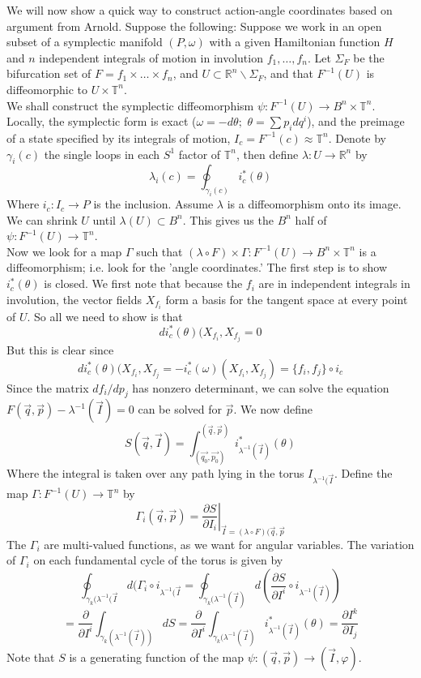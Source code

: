 \indent We will now show a quick way to construct action-angle coordinates based on argument from Arnold. Suppose the following: Suppose we work in an open subset of a symplectic manifold $(P,\omega)$ with a given Hamiltonian function $H$ and $n$ independent integrals of motion in involution $f_1, \ldots, f_n$. Let $\Sigma_F$ be the bifurcation set of $F= f_1 \times \ldots \times f_n$, and $U \subset \mathbb{R}^n \backslash \Sigma_F$, and that $F^{-1}(U)$ is diffeomorphic to $U \times \mathbb{T}^n$.\\
\indent We shall construct the symplectic diffeomorphism $\psi: F^{-1}(U) \to B^n \times \mathbb{T}^n$. Locally, the symplectic form is exact ($\omega = - d \theta; \hspace{4pt} \theta = \sum p_i dq^i$), and the preimage of a state specified by its integrals of motion, $I_c = F^{-1}(c) \approx \mathbb{T}^n$. Denote by $\gamma_i(c)$ the single loops in each $S^1$ factor of $\mathbb{T}^n$, then define $\lambda: U \to \mathbb{R}^n$ by 
\[ \lambda_i(c) = \oint_{\gamma_i(c)} i_c^*(\theta)  \]
\indent Where $i_c: I_c \to P$ is the inclusion. Assume $\lambda$ is a diffeomorphism onto its image. We can shrink $U$ until $\lambda(U) \subset B^n$. This gives us the $B^n$ half of $\psi: F^{-1}(U) \to \mathbb{T}^n$.\\
\indent Now we look for a map $\Gamma$ such that $(\lambda \circ F) \times \Gamma: F^{-1}(U) \to B^n \times \mathbb{T}^n$ is a diffeomorphism; i.e. look for the 'angle coordinates.' The first step is to show $i^*_c(\theta)$ is closed. We first note that because the $f_i$ are in independent integrals in involution, the vector fields $X_{f_i}$ form a basis for the tangent space at every point of $U$. So all we need to show is that
\[ di^*_c(\theta) (X_{f_i}, X_{f_j} =0 \]
But this is clear since
\[ di^*_c(\theta)(X_{f_i},X_{f_j} = -i^*_c(\omega)(X_{f_i},X_{f_j}) = \{f_i,f_j\}\circ i_c \]
Since the matrix $df_i/dp_j$ has nonzero determinant, we can solve the equation $F(\vec{q},\vec{p})-\lambda^{-1}(\vec{I})=0$ can be solved for $\vec{p}$. We now define
\[ S(\vec{q},\vec{I}) = \int_{(\vec{q_0},\vec{p_0})}^{(\vec{q},\vec{p})} i^*_{\lambda^{-1}(\vec{I})}(\theta)  \]
Where the integral is taken over any path lying in the torus $I_{\lambda^{-1}(\vec{I}}$. Define the map $\Gamma: F^{-1}(U) \to \mathbb{T}^n$ by 
\[ \Gamma_i(\vec{q},\vec{p}) = \left. \frac{\partial S}{\partial I_i}\right|_{\vec{I}=(\lambda \circ F)(\vec{q},\vec{p}}  \]
The $\Gamma_i$ are multi-valued functions, as we want for angular variables. The variation of $\Gamma_i$ on each fundamental cycle of the torus is given by
\[\oint_{\gamma_k(\lambda^{-1}(\vec{I}}d(\Gamma_i \circ i_{\lambda^{-1}(\vec{I}}=\oint_{\gamma_k(\lambda^{-1}(\vec{I})} d \left( \frac{\partial S}{\partial I^i} \circ i_{\lambda^{-1}(\vec{I})} \right)\]
\[= \frac{\partial}{\partial I^i} \int_{\gamma_k(\lambda^{-1}(\vec{I}))}dS = \frac{\partial}{\partial I^i} \int_{\gamma_k(\lambda^{-1}(\vec{I})} i^*_{\lambda^{-1}(\vec{I})} (\theta) = \frac{\partial I^k}{\partial I_j}\] 
Note that $S$ is a generating function of the map $\psi: (\vec{q},\vec{p}) \to (\vec{I}, \varphi)$.


